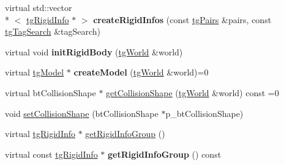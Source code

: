 \begin{DoxyCompactItemize}
\item 
\hypertarget{classtg_rigid_info_a3707c0ddac713beb6287525765f9bd02}{virtual std\-::vector\\*
$<$ \hyperlink{classtg_rigid_info}{tg\-Rigid\-Info} $\ast$ $>$ {\bfseries create\-Rigid\-Infos} (const \hyperlink{classtg_pairs}{tg\-Pairs} \&pairs, const \hyperlink{classtg_tag_search}{tg\-Tag\-Search} \&tag\-Search)}\label{classtg_rigid_info_a3707c0ddac713beb6287525765f9bd02}

\item 
\hypertarget{classtg_rigid_info_ae6a36e5b07c69730e95fc1fef2c1cc7f}{virtual void {\bfseries init\-Rigid\-Body} (\hyperlink{classtg_world}{tg\-World} \&world)}\label{classtg_rigid_info_ae6a36e5b07c69730e95fc1fef2c1cc7f}

\item 
\hypertarget{classtg_rigid_info_a8a898688148766bf840013a99d4306cb}{virtual \hyperlink{classtg_model}{tg\-Model} $\ast$ {\bfseries create\-Model} (\hyperlink{classtg_world}{tg\-World} \&world)=0}\label{classtg_rigid_info_a8a898688148766bf840013a99d4306cb}

\item 
virtual bt\-Collision\-Shape $\ast$ \hyperlink{classtg_rigid_info_a42313c1b58d341c1d5707c105209186d}{get\-Collision\-Shape} (\hyperlink{classtg_world}{tg\-World} \&world) const =0
\item 
void \hyperlink{classtg_rigid_info_a8b6d9ed5609dad929593f6f7f82d3f92}{set\-Collision\-Shape} (bt\-Collision\-Shape $\ast$p\-\_\-bt\-Collision\-Shape)
\item 
virtual \hyperlink{classtg_rigid_info}{tg\-Rigid\-Info} $\ast$ \hyperlink{classtg_rigid_info_a1a0d5dcdb3794c8772abd8d93a646e54}{get\-Rigid\-Info\-Group} ()
\item 
\hypertarget{classtg_rigid_info_aded8e887331027bee5ef4b64b44f455b}{virtual const \hyperlink{classtg_rigid_info}{tg\-Rigid\-Info} $\ast$ {\bfseries get\-Rigid\-Info\-Group} () const }\label{classtg_rigid_info_aded8e887331027bee5ef4b64b44f455b}


\end{DoxyCompactItemize}

